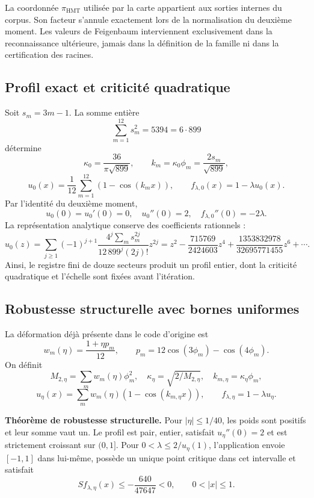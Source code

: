 La coordonnée \(\pi_{\mathrm{HMT}}\) utilisée par la carte appartient aux sorties internes du corpus. Son facteur s’annule exactement lors de la normalisation du deuxième moment. Les valeurs de Feigenbaum interviennent exclusivement dans la reconnaissance ultérieure, jamais dans la définition de la famille ni dans la certification des racines.


\subsection{Profil exact et criticité quadratique}
\label{hmtfg:desarrollo:2}

Soit \(s_m=3m-1\). La somme entière
\[
\sum_{m=1}^{12}s_m^2=5394=6\cdot899
\]
détermine
\[
\kappa_0=\frac{36}{\pi\sqrt{899}},\qquad
k_m=\kappa_0\phi_m=\frac{2s_m}{\sqrt{899}},
\]
\[
u_0(x)=\frac1{12}\sum_{m=1}^{12}(1-\cos(k_mx)),\qquad
f_{\lambda,0}(x)=1-\lambda u_0(x).
\]
Par l’identité du deuxième moment,
\[
u_0(0)=u_0'(0)=0,\quad u_0''(0)=2,\quad
f_{\lambda,0}''(0)=-2\lambda.
\]
La représentation analytique conserve des coefficients rationnels :
\[
u_0(z)=\sum_{j\ge1}(-1)^{j+1}
\frac{4^j\sum_m s_m^{2j}}{12\,899^j(2j)!}z^{2j}
=z^2-\frac{715769}{2424603}z^4
+\frac{1353832978}{32695771455}z^6+\cdots.
\]
Ainsi, le registre fini de douze secteurs produit un profil entier, dont la criticité quadratique et l’échelle sont fixées avant l’itération.


\subsection{Robustesse structurelle avec bornes uniformes}
\label{hmtfg:desarrollo:3}

La déformation déjà présente dans le code d’origine est
\[
w_m(\eta)=\frac{1+\eta p_m}{12},\qquad
p_m=12\cos(3\phi_m)-\cos(4\phi_m).
\]
On définit
\[
M_{2,\eta}=\sum_mw_m(\eta)\phi_m^2,\quad
\kappa_\eta=\sqrt{2/M_{2,\eta}},\quad k_{m,\eta}=\kappa_\eta\phi_m,
\]
\[
u_\eta(x)=\sum_mw_m(\eta)(1-\cos(k_{m,\eta}x)),\qquad
f_{\lambda,\eta}=1-\lambda u_\eta.
\]

\textbf{Théorème de robustesse structurelle.} Pour \(|\eta|\le1/40\), les poids sont positifs et leur somme vaut un. Le profil est pair, entier, satisfait \(u_\eta''(0)=2\) et est strictement croissant sur \((0,1]\). Pour \(0<\lambda\le2/u_\eta(1)\), l’application envoie \([-1,1]\) dans lui-même, possède un unique point critique dans cet intervalle et satisfait
\[
S f_{\lambda,\eta}(x)\le-\frac{640}{47647}<0,\qquad0<|x|\le1.
\]

